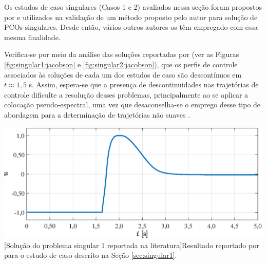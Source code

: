Os estudos de caso singulares (Casos 1 e 2) avaliados nessa seção foram propostos por  e utilizados na validação de um método proposto pelo autor para solução de PCOs singulares. Desde então, vários outros autores \cite{nascentes_resolucao_2012, iasbeck_resolucao_2020} os têm empregado com essa mesma finalidade. %

Verifica-se por meio da análise das soluções reportadas por  (ver as Figuras \ref{fig:singular1:jacobson} e \ref{fig:singular2:jacobson}), que os perfis de controle associados às soluções de cada um dos estudos de caso são descontínuos em $ t \approx 1,5$ s. Assim, espera-se que a presença de descontinuidades nas trajetórias de controle dificulte a resolução desses problemas, principalmente ao se aplicar a colocação pseudo-espectral, uma vez que desaconselha-se o emprego desse tipo de abordagem para a determinação de trajetórias não suaves \cite{becerra_tutorial_2010}. 

\noindent	
\begin{minipage}{\textwidth}
	\vspace{\onelineskip}
	\centering
	\includegraphics[scale=0.7]{fig/resultados/singular1/obs/original}
	[Solução do problema singular 1 reportada na literatura]{Resultado reportado por  para o estudo de caso descrito na Seção \ref{sec:singular1}.}
	\label{fig:singular1:jacobson}
	\vspace{\onelineskip}
\end{minipage} 

